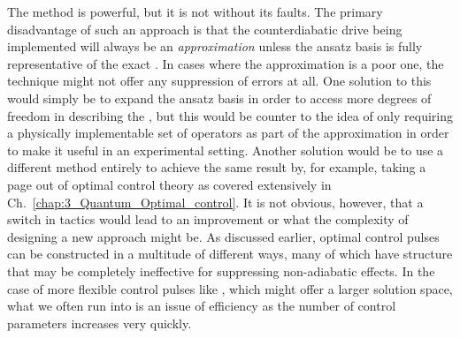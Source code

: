 The  method is powerful, but it is not without its faults. The primary disadvantage of such an approach is that the counterdiabatic drive being implemented will always be an \emph{approximation} unless the ansatz basis is fully representative of the exact . In cases where the approximation is a poor one, the  technique might not offer any suppression of errors at all. One solution to this would simply be to expand the ansatz basis in order to access more degrees of freedom in describing the , but this would be counter to the idea of only requiring a physically implementable set of operators as part of the approximation in order to make it useful in an experimental setting. Another solution would be to use a different method entirely to achieve the same result by, for example, taking a page out of optimal control theory as covered extensively in Ch.~\ref{chap:3_Quantum_Optimal_control}. It is not obvious, however, that a switch in tactics would lead to an improvement or what the complexity of designing a new approach might be. As discussed earlier, optimal control pulses can be constructed in a multitude of different ways, many of which have structure that may be completely ineffective for suppressing non-adiabatic effects. In the case of more flexible control pulses like , which might offer a larger solution space, what we often run into is an issue of efficiency as the number of control parameters increases very quickly. 

